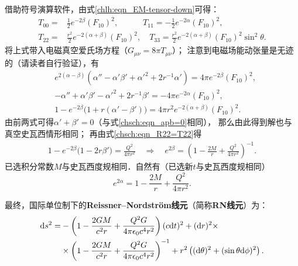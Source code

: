 借助符号演算软件，由式\eqref{chlh:eqn_EM-tensor-down}可得：
\begin{equation}
\begin{aligned}
    T_{00}=& \frac{1}{2} e^{-2 \beta } (F_{10})^2,\qquad\quad
    T_{11}= -\frac{1}{2} e^{-2 \alpha }(F_{10})^2, \\
    T_{22}=& \frac{r^2}{2} e^{-2 (\alpha +\beta )}  (F_{10})^2,\quad
    T_{33}= \frac{r^2}{2} e^{-2 (\alpha +\beta )}  (F_{10})^2 \sin ^2\theta   .
\end{aligned}
\end{equation}
将上式带入电磁真空爱氏场方程（$G_{\mu\nu}=8\pi T_{\mu\nu}$）；
注意到电磁场能动张量是无迹的（请读者自行验证），有
\begin{align}
    &  e^{2(\alpha-\beta)} ( \alpha'' - \alpha'\beta'
    +\alpha'^2 +2 r^{-1} \alpha' ) = 4\pi e^{-2 \beta } (F_{10})^2, \\
    & - \alpha'' + \alpha'\beta' -\alpha'^2  +2 r^{-1} \beta'  
    =-4\pi  e^{-2 \alpha }(F_{10})^2, \\
    & 1 - e^{-2\beta} \bigl(1+ r(\alpha'-\beta')\bigr)
    =4\pi r^2 e^{-2 (\alpha +\beta )}  (F_{10})^2  \label{chsch:eqn_R22=T22}.
\end{align}
由前两式可得$\alpha'+\beta'=0$（与式\eqref{chsch:eqn_apb=0}相同），
那么由此得到解也与真空史瓦西情形相同；
再由式\eqref{chsch:eqn_R22=T22}得
\begin{align}
1 - e^{-2\beta} \bigl(1- 2r\beta'\bigr)= \frac{Q^2}{4\pi r^2} 
\quad \Rightarrow \quad
e^{2\beta}  = \left(1-\frac{2M}{r}+\frac{Q^2 }{4\pi r^2}\right)^{-1} .
\end{align}
已选积分常数$M$与史瓦西度规相同．自然有（已选新$t$与史瓦西度规相同）
\begin{equation}
    e^{2\alpha} =1-\frac{2 M}{ r}+ \frac{Q^2 }{4\pi r^2} .
\end{equation}



最终，国际单位制下的{\bfseries\heiti Reissner--Nordstr\"om线元}（简称{\bfseries\heiti RN线元}）为：
\begin{equation}\label{chsch:eqn_RN-metric}
\begin{aligned}
    {\rm d}s^2 =& - \left(1-\frac{2G M}{c^2 r}+ \frac{Q^2 G }{4\pi \epsilon_0 c^4 r^2} \right) (c{\rm d}t)^2
    + ({\rm d}r)^2 \times \\
    &\times \left(1-\frac{2G M}{c^2 r}+\frac{Q^2 G }{4\pi \epsilon_0 c^4 r^2}\right)^{-1}  
    + r^2 \left(({\rm d}\theta)^2 + (\sin\theta {\rm d}\phi)^2\right).
\end{aligned}    
\end{equation}



